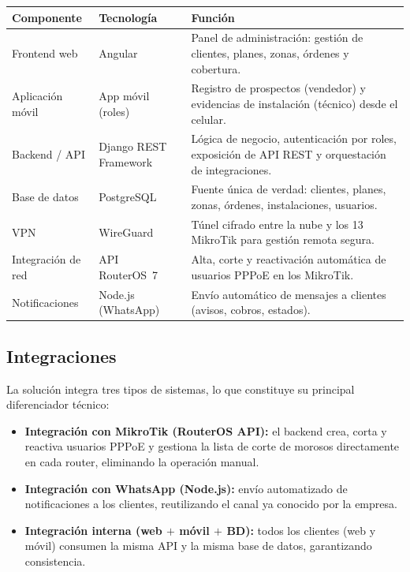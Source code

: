 \begin{center}
\label{tab:componentes}
\begin{tabularx}{\textwidth}{L{3cm} L{3.2cm} X}
\toprule
\textbf{Componente} & \textbf{Tecnología} & \textbf{Función} \\
\midrule
Frontend web & Angular &
Panel de administración: gestión de clientes, planes, zonas, órdenes y cobertura. \\
Aplicación móvil & App móvil (roles) &
Registro de prospectos (vendedor) y evidencias de instalación (técnico) desde el celular. \\
Backend / API & Django REST Framework &
Lógica de negocio, autenticación por roles, exposición de API REST y orquestación de
integraciones. \\
Base de datos & PostgreSQL &
Fuente única de verdad: clientes, planes, zonas, órdenes, instalaciones, usuarios. \\
VPN & WireGuard &
Túnel cifrado entre la nube y los 13 MikroTik para gestión remota segura. \\
Integración de red & API RouterOS~7 &
Alta, corte y reactivación automática de usuarios PPPoE en los MikroTik. \\
Notificaciones & Node.js (WhatsApp) &
Envío automático de mensajes a clientes (avisos, cobros, estados). \\
\bottomrule
\end{tabularx}
\end{center}

\subsection{Integraciones}

La solución integra tres tipos de sistemas, lo que constituye su principal
diferenciador técnico:

\begin{itemize}[leftmargin=1.4em]
  \item \textbf{Integración con MikroTik (RouterOS API):} el backend crea, corta y
  reactiva usuarios PPPoE y gestiona la lista de corte de morosos directamente en cada
  router, eliminando la operación manual.
  \item \textbf{Integración con WhatsApp (Node.js):} envío automatizado de
  notificaciones a los clientes, reutilizando el canal ya conocido por la empresa.
  \item \textbf{Integración interna (web $+$ móvil $+$ BD):} todos los clientes (web y
  móvil) consumen la misma API y la misma base de datos, garantizando consistencia.
\end{itemize}


